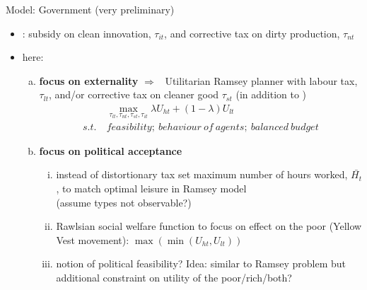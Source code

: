 \documentclass[11pt,aspectratio=169]{beamer}
\newcommand{\ar}{$\Rightarrow$ \ }
\begin{document}
\begin{frame}{Model: Government (very preliminary)}
	\vspace{-2mm}
	\begin{itemize}
\item<+-> 
\cite{Acemoglu2012TheChange}: subsidy on clean innovation, $\tau_{it}$, and corrective tax on dirty production, $\tau_{nt}$
\item<+-> here:

\begin{enumerate}[a)]
	\item \textbf{focus on externality} \ar Utilitarian Ramsey planner with  labour tax, $\tau_{lt}$, and/or corrective tax on cleaner good $\tau_{st}$ (in addition to \cite{Acemoglu2012TheChange})
	\vspace{-3mm}
	\begin{align*}
	&\underset{\tau_{lt}, \tau_{nt}, \tau_{st}, \tau_{it}}{\max} \lambda U_{ht}+(1-\lambda)U_{lt}\\
	s.t.\ & feasibility;\ behaviour\  of\  agents; \  balanced\ budget
	\end{align*}
	\vspace{-5mm}
	\item<+-> \textbf{focus on political acceptance}
	\begin{enumerate}[i)]
		\item<+-> instead of distortionary tax set maximum number of hours worked,  $\bar{H_t}$, to match optimal leisure in Ramsey model\\ (assume types not observable?)
		\item<+-> Rawlsian social welfare function to focus on effect on the poor (Yellow Vest movement): $\max(\min(U_{ht}, U_{lt}))$ 
		\item<+-> \alert{notion of political feasibility?} Idea: similar to Ramsey problem but additional constraint on utility of the poor/rich/both?
	\end{enumerate}
	
\end{enumerate}

	\end{itemize}
\end{frame}
\end{document}
